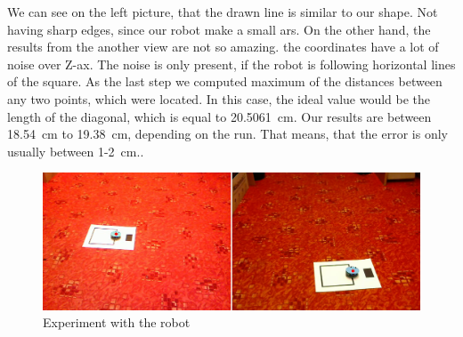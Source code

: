 We can see on the left picture, that the drawn line is similar to our shape.
Not having sharp edges, since our robot make a small ars. On the other hand,
the results from the another view are not so amazing. the coordinates have a
lot of noise over Z-ax. The noise is only present, if the robot is following
horizontal lines of the square. As the last step we computed maximum of the
distances between any two points, which were located. In this case, the ideal
value would be the length of the diagonal, which is equal to 20.5061~cm. Our
results are between 18.54~cm to 19.38~cm, depending on the run. That means,
that the error is only usually between 1-2~cm..

\begin{figure}
\includegraphics[width=\linewidth]{img/experiments/square-robot.png}
\caption{Experiment with the robot}
\label{fig:robot-square}
\end{figure}

